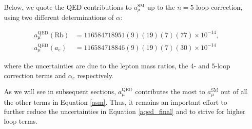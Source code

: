 \documentclass{article}
\numberwithin{equation}{section} %
\begin{document}
Below, we quote the QED contributions to $a_\mu^\mathrm{SM}$ up to the $n=5$-loop correction, using two different determinations of $\alpha$:

\begin{equation}
\begin{split}
a_\mu^\mathrm{QED}(\mathrm{Rb}) &= 116584718951(9)(19)(7)(77)\times 10^{-14},\\
a_\mu^\mathrm{QED}(a_e) &= 116584718846(9)(19)(7)(30)\times 10^{-14}
\end{split}
\label{aqed_final}
\end{equation}

\noindent where the uncertainties are due to the lepton mass ratios, the 4- and 5-loop correction terms and $\alpha_e$ respectively.

As we will see in subsequent sections, $a_\mu^\mathrm{QED}$  contributes the most to $a_\mu^\mathrm{SM}$ out of all the other terms in Equation \ref{asm}. Thus, it remains an important effort to further reduce the uncertainties in Equation \ref{aqed_final} and to strive for higher loop terms.



%
%
%
%
%
\end{document}
